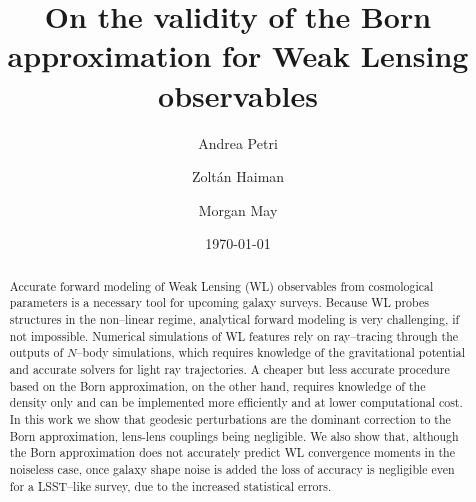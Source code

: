 \documentclass[reprint,aps,prd,superscriptaddress,showkeys,showpacs]{revtex4-1}
\begin{document}
\title{On the validity of the Born approximation for Weak Lensing observables}

\author{Andrea Petri}

\author{Zolt\'an Haiman}

\author{Morgan May}

\date{\today}

\label{firstpage}

\begin{abstract}
Accurate forward modeling of Weak Lensing (WL) observables from cosmological parameters is a necessary tool for upcoming galaxy surveys. Because WL probes structures in the non--linear regime, analytical forward modeling is very challenging, if not impossible. Numerical simulations of WL features rely on ray--tracing through the outputs of $N$--body simulations, which requires knowledge of the gravitational potential and accurate solvers for light ray trajectories. A cheaper but less accurate procedure based on the Born approximation, on the other hand, requires knowledge of the density only and can be implemented more efficiently and at lower computational cost. In this work we show that geodesic perturbations are the dominant correction to the Born approximation, lens-lens couplings being negligible. We also show that, although the Born approximation does not accurately predict WL convergence moments in the noiseless case, once galaxy shape noise is added the loss of accuracy is negligible even for a LSST--like survey, due to the increased statistical errors.    
\end{abstract}



\maketitle


\end{document}
